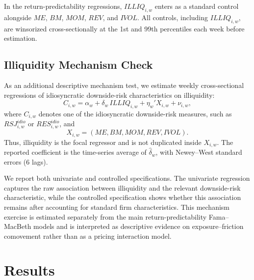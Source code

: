 \documentclass[11pt,a4paper]{article}
\begin{document}
In the return-predictability regressions, $\textit{ILLIQ}_{i,w}$ enters as a
standard control alongside $ME$, $BM$, $MOM$, $REV$, and $IVOL$.
All controls, including $\textit{ILLIQ}_{i,w}$, are winsorized cross-sectionally
at the 1st and 99th percentiles each week before estimation.

\subsection{Illiquidity Mechanism Check}

As an additional descriptive mechanism test, we estimate weekly
cross-sectional regressions of idiosyncratic downside-risk characteristics
on illiquidity:
\begin{equation}
C_{i,w}
=
\alpha_w
+
\delta_w\,ILLIQ_{i,w}
+
\eta_w'X_{i,w}
+
\nu_{i,w},
\label{eq:mech}
\end{equation}
where \(C_{i,w}\) denotes one of the idiosyncratic downside-risk measures,
such as \(RSJ^{idio}_{i,w}\) or \(RES^{idio}_{i,w}\), and
\begin{equation}
X_{i,w}=(ME,BM,MOM,REV,IVOL).
\label{eq:controls_mech}
\end{equation}
Thus, illiquidity is the focal regressor and is not duplicated inside
\(X_{i,w}\). The reported coefficient is the time-series average of
\(\hat{\delta}_w\), with Newey--West standard errors (6 lags).

We report both univariate and controlled specifications. The univariate
regression captures the raw association between illiquidity and the
relevant downside-risk characteristic, while the controlled specification
shows whether this association remains after accounting for standard firm
characteristics. This mechanism exercise is estimated separately from the
main return-predictability Fama--MacBeth models and is interpreted as
descriptive evidence on exposure--friction comovement rather than as a
pricing interaction model.

\section{Results}
\label{sec:results}
\end{document}
